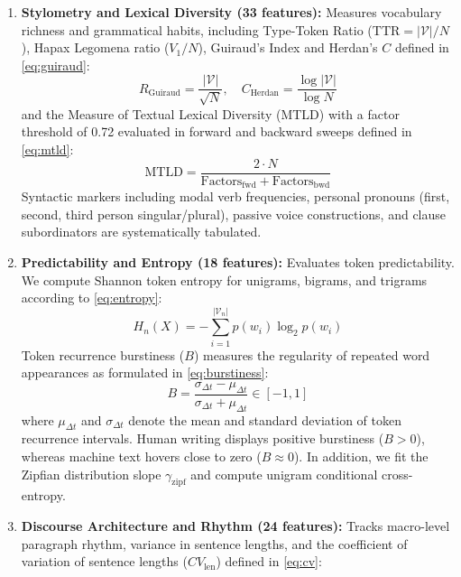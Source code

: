 \documentclass[conference]{IEEEtran}
\begin{document}
\begin{enumerate}
    \item \textbf{Stylometry and Lexical Diversity (33 features):} Measures vocabulary richness and grammatical habits, including Type-Token Ratio ($\text{TTR} = |\mathcal{V}|/N$), Hapax Legomena ratio ($V_1 / N$), Guiraud's Index and Herdan's $C$ defined in \eqref{eq:guiraud}:
    \begin{equation}
    \label{eq:guiraud}
        R_{\text{Guiraud}} = \frac{|\mathcal{V}|}{\sqrt{N}}, \quad C_{\text{Herdan}} = \frac{\log |\mathcal{V}|}{\log N}
    \end{equation}
    and the Measure of Textual Lexical Diversity (MTLD) with a factor threshold of 0.72 evaluated in forward and backward sweeps defined in \eqref{eq:mtld}:
    \begin{equation}
    \label{eq:mtld}
        \text{MTLD} = \frac{2 \cdot N}{\text{Factors}_{\text{fwd}} + \text{Factors}_{\text{bwd}}}
    \end{equation}
    Syntactic markers including modal verb frequencies, personal pronouns (first, second, third person singular/plural), passive voice constructions, and clause subordinators are systematically tabulated.
    \item \textbf{Predictability and Entropy (18 features):} Evaluates token predictability. We compute Shannon token entropy for unigrams, bigrams, and trigrams according to \eqref{eq:entropy}:
    \begin{equation}
    \label{eq:entropy}
        H_n(X) = -\sum_{i=1}^{|\mathcal{V}_n|} p(w_i) \log_2 p(w_i)
    \end{equation}
    Token recurrence burstiness ($B$) measures the regularity of repeated word appearances as formulated in \eqref{eq:burstiness}:
    \begin{equation}
    \label{eq:burstiness}
        B = \frac{\sigma_{\Delta t} - \mu_{\Delta t}}{\sigma_{\Delta t} + \mu_{\Delta t}} \in [-1, 1]
    \end{equation}
    where $\mu_{\Delta t}$ and $\sigma_{\Delta t}$ denote the mean and standard deviation of token recurrence intervals. Human writing displays positive burstiness ($B > 0$), whereas machine text hovers close to zero ($B \approx 0$). In addition, we fit the Zipfian distribution slope $\gamma_{\text{zipf}}$ and compute unigram conditional cross-entropy.
    \item \textbf{Discourse Architecture and Rhythm (24 features):} Tracks macro-level paragraph rhythm, variance in sentence lengths, and the coefficient of variation of sentence lengths ($CV_{\text{len}}$) defined in \eqref{eq:cv}:

\end{enumerate}
\end{document}
